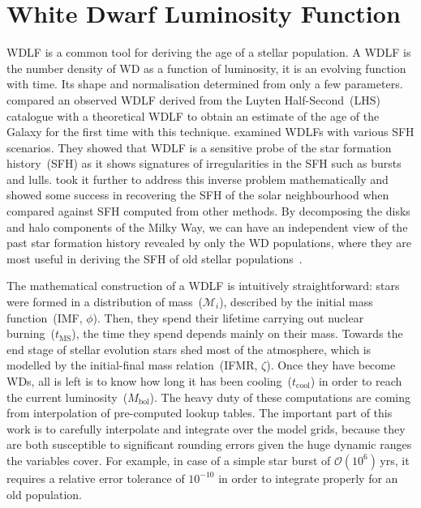\documentclass[fleqn,usenatbib]{rasti}
\begin{document}
\section{White Dwarf Luminosity Function}
WDLF is a common tool for deriving the age of a stellar population. A WDLF is
the number density of WD as a function of luminosity, it is an evolving
function with time. Its shape and normalisation determined from only a few
parameters. \citet{1987ApJ...315L..77W} compared an observed WDLF derived from
the Luyten Half-Second~(LHS) catalogue with a theoretical WDLF to obtain an
estimate of the age of the Galaxy for the first time with this technique.
\citet{1990ApJ...352..605N} examined WDLFs with various SFH scenarios. They
showed that WDLF is a sensitive probe of the star formation history~(SFH) as
it shows signatures of irregularities in the SFH such as bursts and lulls.
\citet{2013MNRAS.434.1549R} took it further to address this inverse problem
mathematically and showed some success in recovering the SFH of the solar
neighbourhood when compared against SFH computed from other methods. By
decomposing the disks and halo components of the Milky Way, we can have an
independent view of the past star formation history revealed by only the
WD populations, where they are most useful in deriving the SFH of old
stellar populations~\citep{2011MNRAS.417...93R, 2017ASPC..509...25L}.


The mathematical construction of a WDLF is intuitively straightforward: stars
were formed in a distribution of mass~($\mathcal{M}_i$), described by the initial
mass function~(IMF, $\phi$). Then, they spend their lifetime carrying out
nuclear burning~($t_{\mathrm{MS}}$), the time they spend depends mainly on
their mass. Towards the end stage of stellar evolution stars shed most of the
atmosphere, which is modelled by the initial-final mass relation~(IFMR,
$\zeta$). Once they have become WDs, all is left is to know how long it has
been cooling~($t_{\mathrm{cool}}$) in order to reach the current
luminosity~($M_\mathrm{bol}$). The heavy duty of these computations
are coming from interpolation of pre-computed lookup tables. The important
part of this work is to carefully interpolate and integrate over the model
grids, because they are both susceptible to significant rounding errors given
the huge dynamic ranges the variables cover. For example, in case of a simple
star burst of $\mathcal{O}(10^6)$\,yrs, it requires a relative error
tolerance of $10^{-10}$ in order to integrate properly for an old population.
\end{document}
